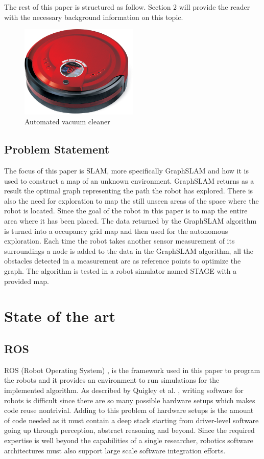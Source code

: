 \documentclass{ba-kecs}
\begin{document}
The rest of this paper is structured as follow. Section 2 will provide the reader with the necessary background information on this topic.

\begin{figure}[htbp]
	\centering
		\includegraphics[width=0.50\textwidth]{figures/vacuum_cleaner.jpg}
	\caption{Automated vacuum cleaner}
	\label{fig:vacuum_cleaner}
\end{figure}

\subsection{Problem Statement}
The focus of this paper is SLAM, more specifically GraphSLAM and how it is used to construct a map of an unknown environment. GraphSLAM returns as a result the optimal graph representing the path the robot has explored. There is also the need for exploration to map the still unseen areas of the space where the robot is located. Since the goal of the robot in this paper is to map the entire area where it has been placed. The data returned by the GraphSLAM algorithm is turned into a occupancy grid map and then used for the autonomous exploration. Each time the robot takes another sensor measurement of its surroundings a node is added to the data in the GraphSLAM algorithm, all the obstacles detected in a measurement are as reference points to optimize the graph. The algorithm is tested in a robot simulator named STAGE with a provided map.

\section{State of the art}
\subsection{ROS}
ROS (Robot Operating System) \cite{Quigley}, is the framework used in this paper to program the robots and it provides an environment to run simulations for the implemented algorithm. As described by Quigley et al. \cite{Quigley}, writing software for robots is difficult since there are so many possible hardware setups which makes code reuse nontrivial. Adding to this problem of hardware setups is the amount of code needed as it must contain a deep stack starting from driver-level software going up through perception, abstract reasoning and beyond. Since the required expertise is well beyond the capabilities of a single researcher, robotics software architectures must also support large scale software integration efforts.
\end{document}
